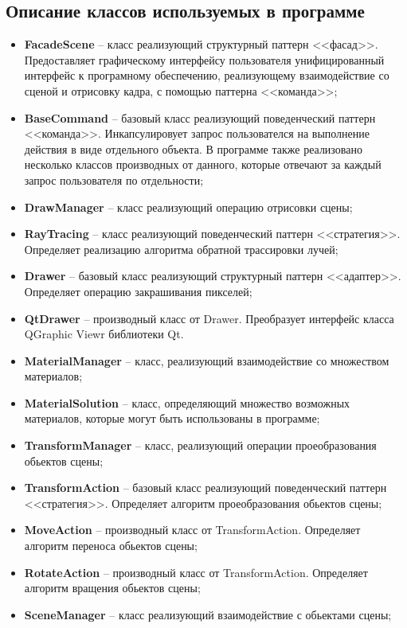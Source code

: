 \subsection{Описание классов используемых в программе}
\begin{itemize}
	\item \textbf{FacadeScene} -- класс реализующий структурный паттерн <<фасад>>. Предоставляет графическому интерфейсу пользователя унифицированный интерфейс к програмному обеспечению, реализующему взаимодействие со сценой и отрисовку кадра, с помощью паттерна <<команда>>;
	\item \textbf{BaseCommand} -- базовый класс реализующий поведенческий паттерн <<команда>>. Инкапсулировует запрос пользователся на выполнение действия в виде отдельного объекта. В программе также реализовано несколько классов производных от данного, которые отвечают за каждый запрос пользователя по отдельности;
	\item \textbf{DrawManager} -- класс реализующий операцию отрисовки сцены;
	\item \textbf{RayTracing} -- класс реализующий поведенческий паттерн <<стратегия>>. Определяет реализацию алгоритма обратной трассировки лучей;
	\item \textbf{Drawer} -- базовый класс реализующий структурный паттерн <<адаптер>>. Определяет операцию закрашивания пикселей;
	\item \textbf{QtDrawer} -- производный класс от Drawer. Преобразует интерфейс класса QGraphic Viewr библиотеки Qt.
	\item \textbf{MaterialManager} -- класс, реализующий взаимодействие со множеством материалов;
	\item \textbf{MaterialSolution} -- класс, определяющий множество возможных материалов, которые могут быть использованы в программе;
	\item \textbf{TransformManager} -- класс, реализующий операции проеобразования обьектов сцены;
	\item \textbf{TransformAction} -- базовый класс реализующий поведенческий паттерн <<стратегия>>. Определяет алгоритм проеобразования обьектов сцены;
	\item \textbf{MoveAction} -- производный класс от TransformAction. Определяет алгоритм переноса обьектов сцены;
	\item \textbf{RotateAction} -- производный класс от TransformAction. Определяет алгоритм вращения обьектов сцены;
	\item \textbf{SceneManager} -- класс реализующий взаимодействие с обьектами сцены;

\end{itemize}
